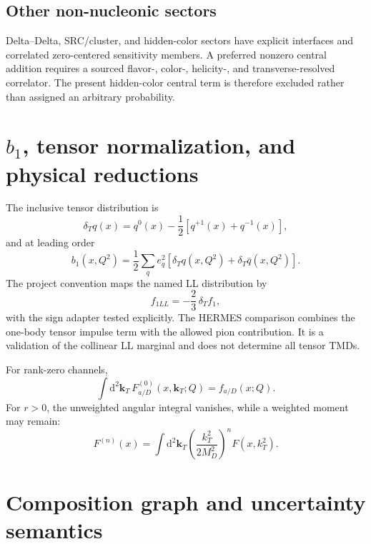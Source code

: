 \documentclass[11pt]{article}
\newcommand{\kT}{\bm{k}_{T}}
\newcommand{\dd}{\mathrm{d}}
\begin{document}
\subsection{Other non-nucleonic sectors}

Delta--Delta, SRC/cluster, and hidden-color sectors have explicit
interfaces and correlated zero-centered sensitivity members.  A preferred
nonzero central addition requires a sourced flavor-, color-, helicity-, and
transverse-resolved correlator.  The present hidden-color central term is
therefore excluded rather than assigned an arbitrary probability.

\section{\texorpdfstring{\(b_1\)}{b1}, tensor normalization, and physical reductions}
\label{sec:b1}

The inclusive tensor distribution is
\begin{equation}
\delta_Tq(x)=q^0(x)-\frac12[q^{+1}(x)+q^{-1}(x)],
\label{eq:tensor-pdf}
\end{equation}
and at leading order
\begin{equation}
b_1(x,Q^2)=\frac12\sum_q e_q^2
\left[\delta_Tq(x,Q^2)+\delta_T\bar q(x,Q^2)\right].
\label{eq:b1}
\end{equation}
The project convention maps the named LL distribution by
\begin{equation}
f_{1LL}=-\frac23\,\delta_T f_1,
\label{eq:f1ll-map}
\end{equation}
with the sign adapter tested explicitly.  The HERMES comparison
\cite{HERMESb1} combines
the one-body tensor impulse term with the allowed pion contribution.  It is
a validation of the collinear LL marginal and does not determine all
tensor TMDs.

For rank-zero channels,
\begin{equation}
\int\dd^2\kT\,F_{a/D}^{(0)}(x,\kT;Q)=f_{a/D}(x;Q).
\label{eq:rankzero-marginal}
\end{equation}
For \(r>0\), the unweighted angular integral vanishes, while a weighted
moment may remain:
\begin{equation}
F^{(n)}(x)=\int\dd^2\kT
\left(\frac{k_T^2}{2M_D^2}\right)^nF(x,k_T^2).
\label{eq:transverse-moment}
\end{equation}

\section{Composition graph and uncertainty semantics}
\label{sec:composition}
\end{document}
